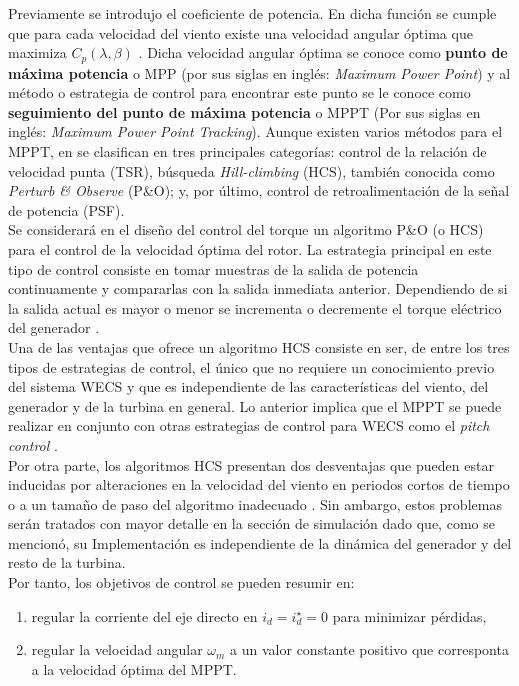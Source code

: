 {Previamente se introdujo el coeficiente de potencia. En dicha función se cumple que
para cada velocidad del viento existe una velocidad angular óptima que maximiza $C_p(\lambda,\beta)$ \cite{Leidhold2002,nak2013}.
Dicha velocidad angular óptima se conoce como \textbf{punto de máxima potencia} o MPP (por sus siglas en inglés: 
\emph{Maximum Power Point}) y al método o estrategia de control para encontrar este punto se le conoce como
\textbf{seguimiento del punto de máxima potencia} o MPPT (Por sus siglas en inglés: \emph{Maximum
Power Point Tracking}). Aunque existen varios métodos para el MPPT, en \cite{nak2013} se 
clasifican en tres principales categorías: control de la relación de velocidad punta (TSR), búsqueda 
\emph{Hill-climbing} (HCS), también conocida como \emph{Perturb \& Observe} (P\&O); y, por último, control de 
retroalimentación de la señal de potencia (PSF).
\\

Se considerará en el diseño del control del torque un algoritmo P\&O (o HCS) para el control de la velocidad óptima del
rotor. La estrategia principal en este tipo de control consiste en tomar muestras de la salida de potencia 
continuamente y compararlas con la salida inmediata anterior. Dependiendo de si la salida actual es mayor o menor
se incrementa o decremente el torque eléctrico del generador \cite{wang2004,buehring1981}.
\\

Una de las ventajas que ofrece un algoritmo HCS consiste en ser, de entre los tres tipos de estrategias
de control, el único que no requiere un conocimiento previo del sistema WECS y que es independiente de 
las características del viento, del generador y de la turbina en general. Lo anterior implica que el MPPT
se puede realizar en conjunto con otras estrategias de control para WECS como el \emph{pitch control} 
\cite{kazmi2011}. 
\\

Por otra parte, los algoritmos HCS presentan dos desventajas que pueden estar inducidas por alteraciones 
en la velocidad del viento en periodos cortos de tiempo o a un tamaño de paso del algoritmo inadecuado 
\cite{kazmi2011,xia2013}. Sin ambargo, estos problemas serán tratados con mayor detalle en la sección de
simulación dado que, como se mencionó, su Implementación es independiente de la dinámica del generador y 
del resto de la turbina. 
\\

Por tanto, los objetivos de control se pueden resumir en:
\begin{enumerate}
    \item regular la corriente del eje directo en $i_d = i_d^\star = 0$ para minimizar pérdidas,
    \item regular la velocidad angular $\omega_m$ a un valor constante positivo que corresponta a 
        la velocidad óptima del MPPT.
\end{enumerate}

}
